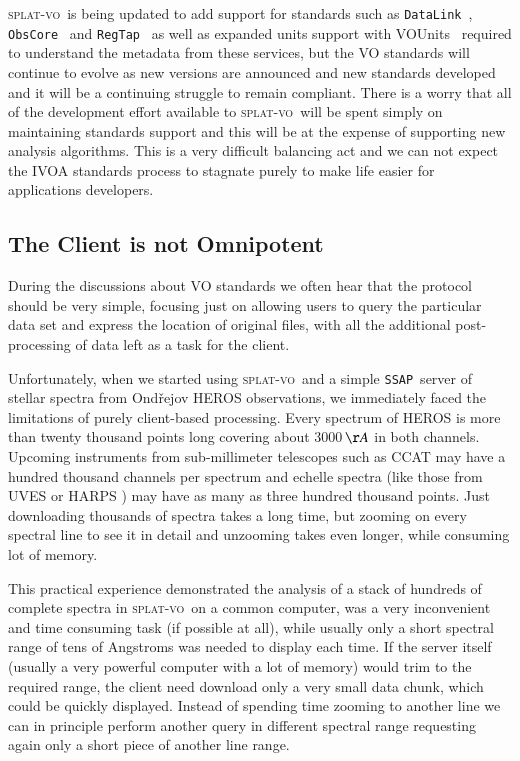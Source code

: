 \documentclass[final,authoryear,5p,times,twocolumn]{elsarticle}
\newcommand{\datalink}{\texttt{DataLink}}
\newcommand{\ssap}{\texttt{SSAP}}
\newcommand{\regtap}{\texttt{RegTap}}
\newcommand{\obscore}{\texttt{ObsCore}}
\newcommand{\vounits}{VOUnits}
\newcommand{\splatvo}{\textsc{splat-vo}}
\begin{document}
\splatvo\ is being updated to add support for standards
such as \datalink\ \citep{datalink}, \obscore\ \citep{obstap} and \regtap\ \citep{regtap} as well as expanded units support with
\vounits\ \citep{vounits} required to understand the metadata from these
services, but the VO standards will continue to evolve
as new versions are announced and new standards developed and it will
be a continuing struggle to remain compliant. There is a worry that
all of the development effort available to \splatvo\ will be spent
simply on maintaining standards support and this will be at the
expense of supporting new analysis algorithms. This is a very
difficult balancing act and we can not expect the IVOA standards
process to stagnate purely to make life easier for applications
developers.

\subsection{The Client is not Omnipotent}

During the discussions about VO standards we often hear that the
protocol should be very simple, focusing just on allowing users to
query the particular data set and express the location of original
files, with all the additional post-processing of data left as a task
for the client.

Unfortunately, when we started using \splatvo\ and a simple \ssap\ server
of stellar spectra from Ond\v{r}ejov HEROS observations, we
immediately faced the limitations of purely client-based
processing. Every spectrum of HEROS \citep{2002PAICz..90....1S} is more than twenty thousand
points long covering about 3000\,$\AA$ in both channels. Upcoming
instruments from sub-millimeter telescopes such as CCAT
\citep{jenness_adassxxiii} may have a hundred thousand channels per
spectrum and echelle spectra (like those from UVES
\citep{2000SPIE.4008..534D} or HARPS \citep{2000SPIE.4008..582P}) may have
as many as three hundred thousand points. Just downloading thousands
of spectra takes a long time, but zooming on every spectral line to
see it in detail and unzooming takes even longer, while consuming lot
of memory.

This practical experience demonstrated the analysis of a stack of hundreds
of complete spectra in \splatvo\ on a common computer, was a very inconvenient and
time consuming task (if possible at all), while usually only a short spectral
range of tens of Angstroms was needed to display each time.  If the server
itself (usually a very powerful computer with a lot of memory) would trim to
the required range, the client need download only a very small data chunk,
which could be quickly displayed.  Instead of spending time zooming to another
line we can in principle perform another query in different spectral range
requesting again only a short piece of another line range.
\end{document}
